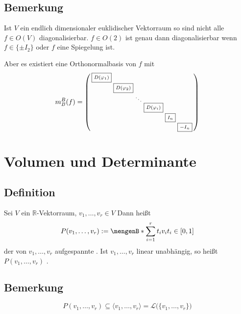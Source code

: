 \subsection[Bemerkung über die Diagonalisierbarkeit von Isometrien auf euklidischen Vektorräumen]{Bemerkung} %
\label{sub:114}
Ist $V$ ein endlich dimensionaler euklidischer Vektorraum so sind nicht alle $f \in O(V)$ diagonalisierbar. $f \in O(2)$ ist genau dann diagonalisierbar wenn 
$f \in \{ \pm I_2 \}$ oder $f$ eine Spiegelung ist.

Aber es existiert eine Orthonormalbasis von $f$ mit
\[
	m_B^B(f) = \enbrace*{\begin{smallmatrix}
		\boxed{ \scriptstyle D(\varphi_1)} &  &  & & & \\
		& \boxed{ \scriptstyle D(\varphi_2)} &  & & & \\
		& & \ddots & & & \\
		& & & \boxed{ \scriptstyle D(\varphi_i)} & & \\
		& & & & \boxed{ \scriptstyle I_n} & \\
		& & & & & \boxed{ \scriptstyle - I_n}
	\end{smallmatrix}}
\]
\newpage
\section{Volumen und Determinante} %
\label{sec:2}
\subsection[Definition Parallelotop]{Definition} %
\label{sub:21}
Sei $V$ ein $\mathds{R}$-Vektorraum, $v_1, \ldots , v_r \in V$ Dann heißt
\[
	P(v_1, \ldots , v_r) := \set[\sum_{i=1}^{r} t_i v_i]{t_i \in [0,1]} 
\]
der von $v_1, \ldots , v_r$ aufgespannte . Ist $v_1, \ldots , v_r$ linear unabhängig, 
so heißt $P(v_1, \ldots , v_r)$ .  

\subsection[Bemerkung Prallelotope sind Teilmenge der linearen Hülle]{Bemerkung} %
\label{sub:22}
\[
	P(v_1, \ldots , v_r) \subseteq \langle v_1, \ldots , v_r \rangle = \mathcal{L} \big(\{ v_1, \ldots , v_r \}\big) 
\]

